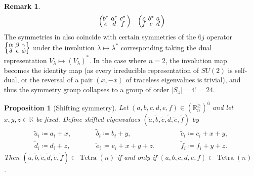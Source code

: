 \documentclass[notitlepage, 11pt, letterpaper]{amsart}
\makeatletter
\theoremstyle{plain}
\newtheorem{prop}[thm]{Proposition}
\theoremstyle{definition}
\newtheorem{rem}[thm]{Remark}%
\let\cref\crtcref
\DeclareMathOperator{\Tetra}{Tetra}
\newcommand{\abs}[1]{\left|#1\right|}
\newcommand{\eigs}[1]{\mathbb R^{\geq}_{#1}}
\newcommand{\ea}{a}
\newcommand{\eb}{b}
\newcommand{\ec}{c}
\newcommand{\ed}{d}
\newcommand{\ee}{e}
\newcommand{\ef}{f}
\newcommand{\yx}{\lambda}
\newcommand{\tightsextuple}[1]{
\begingroup
\arraycolsep=1.5pt
\renewcommand{\arraystretch}{0.3}
\begin{array}{@{}cccccc@{}}#1\end{array}
\endgroup
}
\newcommand{\tightcurlysixj}[1]{
\begingroup
\arraycolsep=1.5pt
\renewcommand{\arraystretch}{0.3}
\left\{\!\begin{array}{ccc}
    #1
\end{array}\!\right\}
\endgroup
}
\newcommand{\abcdefsymbol}{\tightcurlysixj{\alpha & \beta & \gamma \\ \delta & \epsilon & \phi}}
\makeatother
\begin{document}
\begin{rem}
\begin{equation}
\begin{alignedat}{3}
            \quad
            &&\left(\tightsextuple{\eb^* & \ea^*  & \ec^* \\ \ee & \ed & \ef}\right)
            \quad
            &&\left(\tightsextuple{\ec & \eb^* & \ea \\ \ef & \ee & \ed}\right)\\
        \end{alignedat}
    \end{equation}
    The symmetries in \cref{prop:tet_symmetry} also coincide with certain symmetries of the $6j$ operator $\abcdefsymbol$ under the involution $\yx \mapsto \yx^{*}$ corresponding taking the dual representation $V_{\yx} \mapsto (V_{\yx})^{*}$.
    In the case where $n = 2$, the involution map becomes the identity map (as every irreducible representation of $SU(2)$ is self-dual, or the reversal of a pair $(x,-x)$ of traceless eigenvalues is trivial), and thus the symmetry group collapses to a group of order $\abs{S_4} = 4! = 24$.
\end{rem}
\begin{prop}[Shifting symmetry]
    \label{prop:shifting}
    Let $(\ea, \eb, \ec, \ed, \ee, \ef) \in (\eigs{n})^{6}$ and let $x,y,z \in \mathbb R$ be fixed.
    Define shifted eigenvalues $(\tilde \ea, \tilde \eb, \tilde \ec, \tilde \ed, \tilde \ee,\tilde \ef)$ by
    \begin{equation}
        \label{eq:shifted_tet_eigenvalues}
        \begin{alignedat}{3}
             &\tilde \ea_i \coloneqq \ea_i + x, \qquad
            &&\tilde \eb_i \coloneqq \eb_i + y, \qquad
            &&\tilde \ec_i \coloneqq \ec_i + x + y, \\
             &\tilde \ed_i \coloneqq \ed_i + z, \qquad
            &&\tilde \ee_i \coloneqq \ee_i + x + y + z, \qquad
            &&\tilde \ef_i \coloneqq \ef_i + y + z.
        \end{alignedat}
    \end{equation}
    Then $(\tilde \ea, \tilde \eb, \tilde \ec, \tilde \ed, \tilde \ee,\tilde \ef) \in \Tetra(n)$ if and only if $(\ea, \eb, \ec, \ed, \ee, \ef) \in \Tetra(n)$.
\end{prop}
\end{document}
